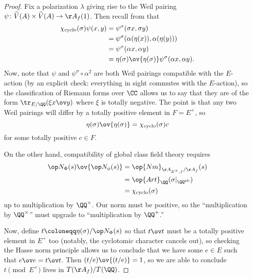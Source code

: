 \documentclass[../notes.tex]{subfiles}
\begin{document}
\begin{proof}
	Fix a polarization $\lambda$ giving rise to the Weil pairing $\psi\colon\widehat V(A)\times\widehat V(A)\to\AA_f(1)$. Then recall from  that
	\begin{align*}
		\chi_{\mathrm{cyclo}}(\sigma)\psi(x,y) &= \psi^\sigma(\sigma x,\sigma y) \\
		&= \psi^\sigma(\alpha(\eta(x)),\alpha(\eta(y))) \\
		&= \psi^\sigma(\alpha x,\alpha y) \\
		&= \eta(\sigma)\ov{\eta(\sigma)}\psi^\sigma(\alpha x,\alpha y).
	\end{align*}
	Now, note that $\psi$ and $\psi^\sigma\circ\alpha^2$ are both Weil pairings compatible with the $E$-action (by an explicit check: everything in sight commutes with the $E$-action), so the classification of Riemann forms over $\CC$ allows us to say that they are of the form $\tr_{E/\QQ}(\xi x\ov y)$ where $\xi$ is totally negative. The point is that any two Weil pairings will differ by a totally positive element in $F=E^+$, so
	\[\eta(\sigma)\ov{\eta(\sigma)}=\chi_{\mathrm{cyclo}}(\sigma)c\]
	for some totally positive $c\in F$.

	On the other hand, compatibility of global class field theory requires
	\begin{align*}
		\op N_\Phi(s)\ov{\op N_\phi(s)} &= \op{Nm}_{\AA_{E^\times,f}/\AA_f}(s) \\
		&= \op{Art}_\QQ(\sigma|_{\QQ^{\mathrm{ab}}}) \\
		&= \chi_{\mathrm{cyclo}}(\sigma)
	\end{align*}
	up to multiplication by $\QQ^\times$. Our norm must be positive, so the ``multiplication by $\QQ^\times$'' must upgrade to ``multiplication by $\QQ^+$.''

	Now, define $t\coloneqq\eta(\sigma)/\op N_\Phi(s)$ so that $t\ov t$ must be a totally positive element in $E^+$ too (notably, the cyclotomic character cancels out), so checking the Hasse norm principle allows us to conclude that we have some $e\in E$ such that $e\ov e=t\ov t$. Then $(t/e)\ov{(t/e)}=1$, so we are able to conclude $t\pmod{E^\times}$ lives in $T(\AA_f)/T(\QQ)$.
\end{proof}
\end{document}
